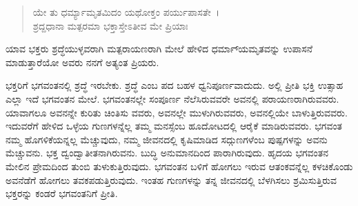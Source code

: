 \begin{verse}
ಯೇ ತು ಧರ್ಮ್ಯಾಮೃತಮಿದಂ ಯಥೋಕ್ತಂ ಪರ್ಯುಪಾಸತೇ~।\\ಶ್ರದ್ದಧಾನಾ ಮತ್ಪರಮಾ ಭಕ್ತಾಸ್ತೇಽತೀವ ಮೇ ಪ್ರಿಯಾಃ 
\end{verse}

{\small ಯಾವ ಭಕ್ತರು ಶ್ರದ್ಧೆಯುಳ್ಳವರಾಗಿ ಮತ್ಪರಾಯಣರಾಗಿ ಮೇಲೆ ಹೇಳಿದ ಧರ್ಮಾ್ಯಮೃತವನ್ನು ಉಪಾಸನೆ ಮಾಡುತ್ತಾರೆಯೋ ಅವರು ನನಗೆ ಅತ್ಯಂತ ಪ್ರಿಯರು.}

ಭಕ್ತರಿಗೆ ಭಗವಂತನಲ್ಲಿ ಶ್ರದ್ಧೆ ಇರಬೇಕು. ಶ್ರದ್ಧೆ ಎಂಬ ಪದ ಬಹಳ ಧ್ವನಿಪೂರ್ಣವಾದುದು. ಅಲ್ಲಿ ಪ್ರೀತಿ ಭಕ್ತಿ ಉತ್ಸಾಹ ಎಲ್ಲಾ ಇದೆ ಭಗವಂತನ ಮೇಲೆ. ಭಗವಂತನಲ್ಲೇ ಸಂಪೂರ್ಣ ನೆಲೆಸಿರುವವರೇ ಅವನಲ್ಲಿ ಪರಾಯಣರಾಗಿರುವವರು. ಯಾವಾಗಲೂ ಅವನನ್ನೇ ಕುರಿತು ಚಿಂತಿಸು ವವರು, ಅವನಲ್ಲೇ ಮುಳುಗಿರುವವರು, ಅವನಲ್ಲಿಯೇ ಬಾಳುತ್ತಿರುವವರು. ಇದುವರೆಗೆ ಹೇಳಿದ ಒಳ್ಳೆಯ ಗುಣಗಳನ್ನೆಲ್ಲ ತಮ್ಮ ಮನಸ್ಸೆಂಬ ಹೂದೋಟದಲ್ಲಿ ಆರೈಕೆ ಮಾಡಿರುವವರು. ಭಗವಂತ ನಮ್ಮ ಹೊಗಳಿಕೆಯನ್ನಲ್ಲ ಮೆಚ್ಚುವುದು, ನಮ್ಮ ಜೀವನದಲ್ಲಿ ಕೃಷಿಮಾಡಿದ ಸದ್ಗುಣಗಳೆಂಬ ಪುಷ್ಪಗಳನ್ನು ಅವನು ಮೆಚ್ಚುವನು. ಭಕ್ತ ದ್ವಂದ್ವಾತೀತನಾಗಿರುವನು. ಬುದ್ಧಿ ಅನುಮಾನದಿಂದ ಪಾರಾಗಿರುವುದು. ಹೃದಯ ಭಗವಂತನ ಮೇಲಿನ ಪ್ರೇಮದಿಂದ ತುಂಬಿ ತುಳುಕುತ್ತಿರುವುದು. ಭಗವಂತನ ಬಳಿಗೆ ಹೋಗಲು ಇರುವ ಆತಂಕವನ್ನೆಲ್ಲ ಕಳಚಿಕೊಂಡು ಅವನೆಡೆಗೆ ಹೋಗಲು ತವಕಪಡುತ್ತಿರುವುದು. ಇಂತಹ ಗುಣಗಳನ್ನು ತನ್ನ ಜೀವನದಲ್ಲಿ ಬೆಳಗಿಸಲು ಶ್ರಮಿಸುತ್ತಿರುವ ಭಕ್ತರನ್ನು ಕಂಡರೆ ಭಗವಂತನಿಗೆ ಪ್ರೀತಿ.

